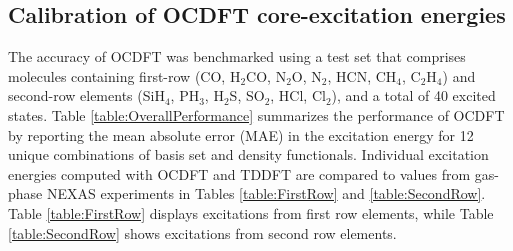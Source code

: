 \documentclass[12pt]{article}
\begin{document}
\subsection{Calibration of OCDFT core-excitation energies}
The accuracy of OCDFT was benchmarked using a test set that comprises molecules containing first-row (CO, H$_2$CO, N$_2$O, N$_2$, HCN, CH$_4$, C$_2$H$_4$) and second-row elements (SiH$_4$, PH$_3$, H$_2$S, SO$_2$, HCl, Cl$_2$), and a total of 40 excited states. 
Table \ref{table:OverallPerformance} summarizes the performance of OCDFT by reporting the mean absolute error (MAE) in the excitation energy for 12 unique combinations of basis set and density functionals.
Individual excitation energies computed with OCDFT and TDDFT are compared to values from gas-phase NEXAS experiments \cite{puttner_vibrationally_1999,remmers_high-resolution_1992,chen_k-shell_1989,tronc_nitrogen_1980,tronc_carbon_1979,francis_studies_1994,adachi_vibronic_1999,hitchcock_k-shell_1979,domke_carbon_1990,nayandin_angle-resolved_2001,bodeur_single-and_1990,gedat_s_1998,hudson_high-resolution_1994,cavell_chemical_1999,bodeur_photoabsorption_1985} in Tables \ref{table:FirstRow} and \ref{table:SecondRow}. Table \ref{table:FirstRow} displays excitations from first row elements, while Table \ref{table:SecondRow} shows excitations from second row elements.
\end{document}
